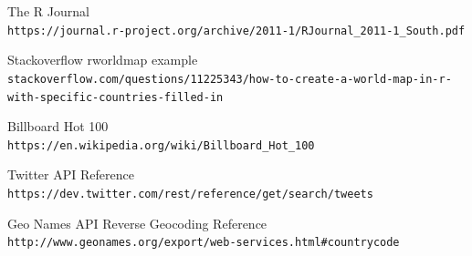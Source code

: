 \documentclass{article}
\begin{document}
\begin{thebibliography}{9}

The R Journal
\\\texttt{https://journal.r-project.org/archive/2011-1/RJournal\_2011-1\_South.pdf}

Stackoverflow rworldmap example
\\\texttt{stackoverflow.com/questions/11225343/how-to-create-a-world-map-in-r-with-specific-countries-filled-in}

Billboard Hot 100
\\\texttt{https://en.wikipedia.org/wiki/Billboard\_Hot\_100}

Twitter API Reference
\\\texttt{https://dev.twitter.com/rest/reference/get/search/tweets}

Geo Names API Reverse Geocoding Reference
\\\texttt{http://www.geonames.org/export/web-services.html\#countrycode}

\end{thebibliography}
\end{document}
